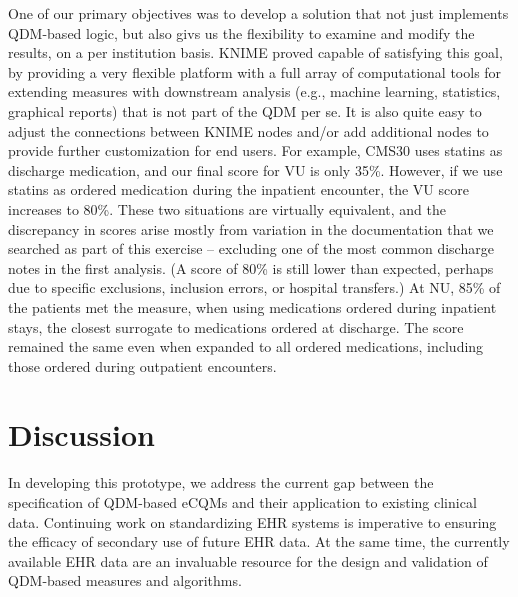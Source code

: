 \documentclass{article}
\begin{document}
One of our primary objectives was to develop a solution that not just implements QDM-based logic, but also givs us the flexibility to examine and modify the results, on a per institution basis. KNIME proved capable of satisfying this goal, by providing a very flexible platform with a full array of computational tools for extending measures with downstream analysis (e.g., machine learning, statistics, graphical reports) that is not part of the QDM per se. It is also quite easy to adjust the connections between KNIME nodes and/or add additional nodes to provide further customization for end users. For example, CMS30 uses statins as discharge medication, and our final score for VU is only 35\%. However, if we use statins as ordered medication during the inpatient encounter, the VU score increases to 80\%. These two situations are virtually equivalent, and the discrepancy in scores arise mostly from variation in the documentation that we searched as part of this exercise -- excluding one of the most common discharge notes in the first analysis. (A score of 80\% is still lower than expected, perhaps due to specific exclusions, inclusion errors, or hospital transfers.) At NU, 85\% of the patients met the measure, when using medications ordered during inpatient stays, the closest surrogate to medications ordered at discharge. The score remained the same even when expanded to all ordered medications, including those ordered during outpatient encounters.

\section{Discussion}

In developing this prototype, we address the current gap between the specification of QDM-based eCQMs and their application to existing clinical data. Continuing work on standardizing EHR systems is imperative to ensuring the efficacy of secondary use of future EHR data. At the same time, the currently available EHR data are an invaluable resource for the design and validation of QDM-based measures and algorithms.
\end{document}
